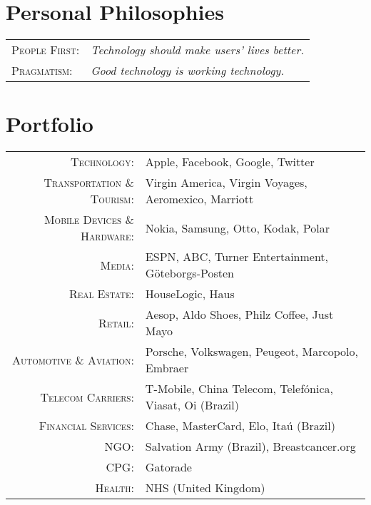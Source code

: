 \documentclass[a4paper,10pt]{article}
\begin{document}
\section{Personal Philosophies}
\begin{tabular}{ll}

  \textsc{People First:} & \emph{Technology should make users' lives
    better.} \\

  \textsc{Pragmatism:} & \emph{Good technology is working technology.}
  
\end{tabular}


\section{Portfolio}

\begin{tabular}{rl}
  \textsc{Technology:} &
    Apple,
    Facebook,
    Google,
    Twitter \\

  \textsc{Transportation \& Tourism:} &
    Virgin America,
    Virgin Voyages,
    Aeromexico,
    Marriott \\

  \textsc{Mobile Devices \& Hardware:} &

    Nokia,
    Samsung,
    Otto,
    Kodak,
    Polar \\

  \textsc{Media:} &

    ESPN,
    ABC,
    Turner Entertainment,
    G\"{o}teborgs-Posten \\

  \textsc{Real Estate:} &

    HouseLogic,
    Haus\\

  \textsc{Retail:} &

    Aesop,
    Aldo Shoes,
    Philz Coffee,
    Just Mayo\\

  \textsc{Automotive \& Aviation:} &

    Porsche,
    Volkswagen,
    Peugeot,
    Marcopolo,
    Embraer\\

  \textsc{Telecom Carriers:} &

    T-Mobile,
    China Telecom,
    Telef\'{o}nica,
    Viasat,
    Oi (Brazil)\\

  \textsc{Financial Services:} &

    Chase,
    MasterCard,
    Elo,
    Ita\'{u} (Brazil)\\

  \textsc{NGO:} &

    Salvation Army (Brazil),
    Breastcancer.org\\
    
  \textsc{CPG:} &

    Gatorade\\

  \textsc{Health:} &

    NHS (United Kingdom)
\end{tabular}
\end{document}
